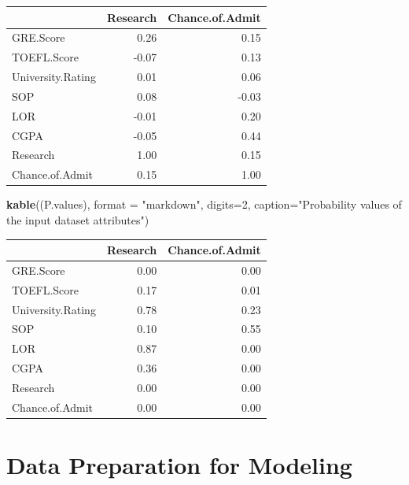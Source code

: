 \documentclass[11pt,]{article}
\newenvironment{Shaded}{\begin{snugshade}}{\end{snugshade}}
\newcommand{\CommentTok}[1]{\textcolor[rgb]{0.56,0.35,0.01}{\textit{#1}}}
\newcommand{\DataTypeTok}[1]{\textcolor[rgb]{0.13,0.29,0.53}{#1}}
\newcommand{\DecValTok}[1]{\textcolor[rgb]{0.00,0.00,0.81}{#1}}
\newcommand{\KeywordTok}[1]{\textcolor[rgb]{0.13,0.29,0.53}{\textbf{#1}}}
\newcommand{\NormalTok}[1]{#1}
\newcommand{\OperatorTok}[1]{\textcolor[rgb]{0.81,0.36,0.00}{\textbf{#1}}}
\newcommand{\StringTok}[1]{\textcolor[rgb]{0.31,0.60,0.02}{#1}}
\begin{document}
\begin{Shaded}
\end{Shaded}

\begin{longtable}[]{@{}lrr@{}}
\toprule
& Research & Chance.of.Admit\tabularnewline
\midrule
\endhead
GRE.Score & 0.26 & 0.15\tabularnewline
TOEFL.Score & -0.07 & 0.13\tabularnewline
University.Rating & 0.01 & 0.06\tabularnewline
SOP & 0.08 & -0.03\tabularnewline
LOR & -0.01 & 0.20\tabularnewline
CGPA & -0.05 & 0.44\tabularnewline
Research & 1.00 & 0.15\tabularnewline
Chance.of.Admit & 0.15 & 1.00\tabularnewline
\bottomrule
\end{longtable}

\begin{Shaded}
\begin{Highlighting}[]
\KeywordTok{kable}\NormalTok{((P.values), }\DataTypeTok{format =} \StringTok{"markdown"}\NormalTok{, }\DataTypeTok{digits=}\DecValTok{2}\NormalTok{, }
      \DataTypeTok{caption=}\StringTok{"Probability values  of the input dataset attributes"}\NormalTok{) }
\end{Highlighting}
\end{Shaded}

\begin{longtable}[]{@{}lrr@{}}
\toprule
& Research & Chance.of.Admit\tabularnewline
\midrule
\endhead
GRE.Score & 0.00 & 0.00\tabularnewline
TOEFL.Score & 0.17 & 0.01\tabularnewline
University.Rating & 0.78 & 0.23\tabularnewline
SOP & 0.10 & 0.55\tabularnewline
LOR & 0.87 & 0.00\tabularnewline
CGPA & 0.36 & 0.00\tabularnewline
Research & 0.00 & 0.00\tabularnewline
Chance.of.Admit & 0.00 & 0.00\tabularnewline
\bottomrule
\end{longtable}

\hypertarget{data-preparation-for-modeling}{%
\section{Data Preparation for
Modeling}\label{data-preparation-for-modeling}}
\end{document}
